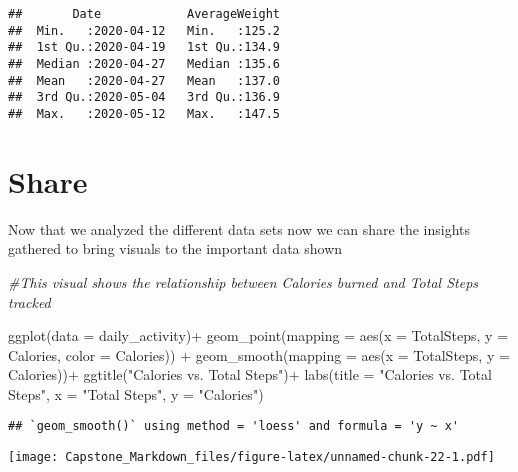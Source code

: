\documentclass[
]{article}
\newenvironment{Shaded}{\begin{snugshade}}{\end{snugshade}}
\newcommand{\AttributeTok}[1]{\textcolor[rgb]{0.77,0.63,0.00}{#1}}
\newcommand{\CommentTok}[1]{\textcolor[rgb]{0.56,0.35,0.01}{\textit{#1}}}
\newcommand{\FunctionTok}[1]{\textcolor[rgb]{0.00,0.00,0.00}{#1}}
\newcommand{\NormalTok}[1]{#1}
\newcommand{\SpecialCharTok}[1]{\textcolor[rgb]{0.00,0.00,0.00}{#1}}
\newcommand{\StringTok}[1]{\textcolor[rgb]{0.31,0.60,0.02}{#1}}
\begin{document}
\begin{verbatim}
##       Date            AverageWeight  
##  Min.   :2020-04-12   Min.   :125.2  
##  1st Qu.:2020-04-19   1st Qu.:134.9  
##  Median :2020-04-27   Median :135.6  
##  Mean   :2020-04-27   Mean   :137.0  
##  3rd Qu.:2020-05-04   3rd Qu.:136.9  
##  Max.   :2020-05-12   Max.   :147.5
\end{verbatim}

\hypertarget{share}{%
\section{\texorpdfstring{\textbf{Share}}{Share}}\label{share}}

Now that we analyzed the different data sets now we can share the
insights gathered to bring visuals to the important data shown

\begin{Shaded}
\begin{Highlighting}[]
\CommentTok{\#This visual shows the relationship between Calories burned and Total Steps tracked }

\FunctionTok{ggplot}\NormalTok{(}\AttributeTok{data =}\NormalTok{ daily\_activity)}\SpecialCharTok{+}
  \FunctionTok{geom\_point}\NormalTok{(}\AttributeTok{mapping =} \FunctionTok{aes}\NormalTok{(}\AttributeTok{x =}\NormalTok{ TotalSteps, }\AttributeTok{y =}\NormalTok{ Calories, }\AttributeTok{color =}\NormalTok{ Calories)) }\SpecialCharTok{+}
  \FunctionTok{geom\_smooth}\NormalTok{(}\AttributeTok{mapping =} \FunctionTok{aes}\NormalTok{(}\AttributeTok{x =}\NormalTok{ TotalSteps, }\AttributeTok{y =}\NormalTok{ Calories))}\SpecialCharTok{+} 
  \FunctionTok{ggtitle}\NormalTok{(}\StringTok{"Calories vs. Total Steps"}\NormalTok{)}\SpecialCharTok{+}
  \FunctionTok{labs}\NormalTok{(}\AttributeTok{title =} \StringTok{"Calories vs. Total Steps"}\NormalTok{,}
       \AttributeTok{x =} \StringTok{"Total Steps"}\NormalTok{, }\AttributeTok{y =} \StringTok{"Calories"}\NormalTok{)}
\end{Highlighting}
\end{Shaded}

\begin{verbatim}
## `geom_smooth()` using method = 'loess' and formula = 'y ~ x'
\end{verbatim}

\texttt{[image: Capstone\_Markdown\_files/figure-latex/unnamed-chunk-22-1.pdf]}
\end{document}
